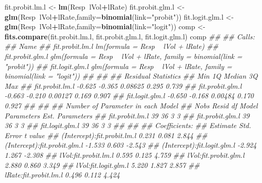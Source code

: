 \documentclass[
]{article}
\newenvironment{Shaded}{\begin{snugshade}}{\end{snugshade}}
\newcommand{\CommentTok}[1]{\textcolor[rgb]{0.56,0.35,0.01}{\textit{#1}}}
\newcommand{\DataTypeTok}[1]{\textcolor[rgb]{0.13,0.29,0.53}{#1}}
\newcommand{\KeywordTok}[1]{\textcolor[rgb]{0.13,0.29,0.53}{\textbf{#1}}}
\newcommand{\NormalTok}[1]{#1}
\newcommand{\OperatorTok}[1]{\textcolor[rgb]{0.81,0.36,0.00}{\textbf{#1}}}
\newcommand{\StringTok}[1]{\textcolor[rgb]{0.31,0.60,0.02}{#1}}
\begin{document}
\begin{Shaded}
\begin{Highlighting}[]
\NormalTok{fit.probit.lm.l <-}\StringTok{ }\KeywordTok{lm}\NormalTok{(Resp}\OperatorTok{~}\NormalTok{lVol}\OperatorTok{+}\NormalTok{lRate)}
\NormalTok{fit.probit.glm.l <-}\StringTok{ }\KeywordTok{glm}\NormalTok{(Resp}\OperatorTok{~}\NormalTok{lVol}\OperatorTok{+}\NormalTok{lRate,}\DataTypeTok{family=}\KeywordTok{binomial}\NormalTok{(}\DataTypeTok{link=}\StringTok{"probit"}\NormalTok{))}
\NormalTok{fit.logit.glm.l <-}\StringTok{ }\KeywordTok{glm}\NormalTok{(Resp}\OperatorTok{~}\NormalTok{lVol}\OperatorTok{+}\NormalTok{lRate,}\DataTypeTok{family=}\KeywordTok{binomial}\NormalTok{(}\DataTypeTok{link=}\StringTok{"logit"}\NormalTok{))}
\NormalTok{comp <-}\StringTok{ }\KeywordTok{fits.compare}\NormalTok{(fit.probit.lm.l, fit.probit.glm.l, fit.logit.glm.l)}
\NormalTok{comp}
\CommentTok{## }
\CommentTok{## Calls: }
\CommentTok{## Name}
\CommentTok{## fit.probit.lm.l     lm(formula = Resp ~ lVol + lRate)}
\CommentTok{## fit.probit.glm.l    glm(formula = Resp ~ lVol + lRate, family = binomial(link = "probit"))}
\CommentTok{## fit.logit.glm.l     glm(formula = Resp ~ lVol + lRate, family = binomial(link = "logit"))}
\CommentTok{## }
\CommentTok{## }
\CommentTok{## Residual Statistics}
\CommentTok{##                     Min     1Q  Median    3Q   Max}
\CommentTok{## fit.probit.lm.l  -0.625 -0.365 0.08625 0.295 0.739}
\CommentTok{## fit.probit.glm.l -0.663 -0.210 0.00127 0.169 0.907}
\CommentTok{## fit.logit.glm.l  -0.650 -0.168 0.00484 0.170 0.927}
\CommentTok{## }
\CommentTok{## }
\CommentTok{## Number of Parameter in each Model}
\CommentTok{##                  Nobs Resid df Model Parameters Est. Parameters}
\CommentTok{## fit.probit.lm.l    39       36                3               3}
\CommentTok{## fit.probit.glm.l   39       36                3               3}
\CommentTok{## fit.logit.glm.l    39       36                3               3}
\CommentTok{## }
\CommentTok{## }
\CommentTok{## Coefficients:}
\CommentTok{##                              Estimate Std. Error t value}
\CommentTok{## (Intercept):fit.probit.lm.l   0.231    0.081      2.844 }
\CommentTok{## (Intercept):fit.probit.glm.l -1.533    0.603     -2.543 }
\CommentTok{## (Intercept):fit.logit.glm.l  -2.924    1.267     -2.308 }
\CommentTok{## lVol:fit.probit.lm.l          0.595    0.125      4.759 }
\CommentTok{## lVol:fit.probit.glm.l         2.880    0.860      3.349 }
\CommentTok{## lVol:fit.logit.glm.l          5.220    1.827      2.857 }
\CommentTok{## lRate:fit.probit.lm.l         0.496    0.112      4.424 }

\end{Highlighting}
\end{Shaded}
\end{document}
